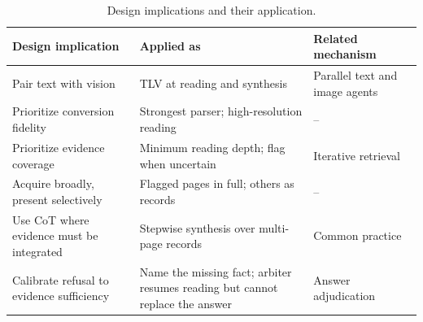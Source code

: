 \begin{table}[t]
\centering
\small
\setlength{\tabcolsep}{4pt}
\renewcommand{\arraystretch}{1.15}
\begin{tabular}{@{}
  >{\raggedright\arraybackslash}p{}
  >{\raggedright\arraybackslash}p{}
  >{\raggedright\arraybackslash}p{}@{}}
\toprule
\textbf{Design implication} & \textbf{Applied as} & \textbf{Related mechanism} \\
\midrule
Pair text with vision & TLV at reading and synthesis & Parallel text and image agents~\citep{han2025mdocagent} \\
Prioritize conversion fidelity & Strongest parser; high-resolution reading & -- \\
Prioritize evidence coverage & Minimum reading depth; flag when uncertain & Iterative retrieval~\citep{jain2025simpledoc} \\
Acquire broadly, present selectively & Flagged pages in full; others as records & -- \\
Use CoT where evidence must be integrated & Stepwise synthesis over multi-page records & Common practice \\
Calibrate refusal to evidence sufficiency & Name the missing fact; arbiter resumes reading but cannot replace the answer & Answer adjudication~\citep{zhu2026doclens} \\
\bottomrule
\end{tabular}
\caption{Design implications and their application.}
\label{tab:design_mapping}
\end{table}